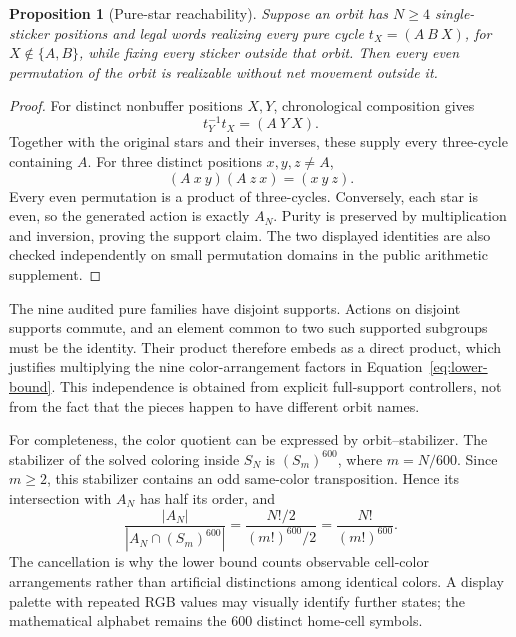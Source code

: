 \documentclass[a4paper,11pt]{article}
\newtheorem{proposition}{Proposition}[section]
\begin{document}
\begin{proposition}[Pure-star reachability]
Suppose an orbit has \(N\ge4\) single-sticker positions and legal words realizing every pure cycle \(t_X=(A\ B\ X)\), for \(X\notin\{A,B\}\), while fixing every sticker outside that orbit. Then every even permutation of the orbit is realizable without net movement outside it.
\end{proposition}
\begin{proof}
For distinct nonbuffer positions \(X,Y\), chronological composition gives
\begin{equation}
t_Y^{-1}t_X=(A\ Y\ X).
\label{eq:star-generation}
\end{equation}
Together with the original stars and their inverses, these supply every three-cycle containing \(A\). For three distinct positions \(x,y,z\ne A\),
\begin{equation}
(A\ x\ y)(A\ z\ x)=(x\ y\ z).
\label{eq:all-three-cycles}
\end{equation}
Every even permutation is a product of three-cycles. Conversely, each star is even, so the generated action is exactly \(A_N\). Purity is preserved by multiplication and inversion, proving the support claim. The two displayed identities are also checked independently on small permutation domains in the public arithmetic supplement.
\end{proof}

The nine audited pure families have disjoint supports. Actions on disjoint supports commute, and an element common to two such supported subgroups must be the identity. Their product therefore embeds as a direct product, which justifies multiplying the nine color-arrangement factors in Equation~\eqref{eq:lower-bound}. This independence is obtained from explicit full-support controllers, not from the fact that the pieces happen to have different orbit names.

For completeness, the color quotient can be expressed by orbit--stabilizer. The stabilizer of the solved coloring inside \(S_N\) is \((S_m)^{600}\), where \(m=N/600\). Since \(m\ge2\), this stabilizer contains an odd same-color transposition. Hence its intersection with \(A_N\) has half its order, and
\begin{equation}
\frac{|A_N|}{|A_N\cap(S_m)^{600}|}
=\frac{N!/2}{(m!)^{600}/2}
=\frac{N!}{(m!)^{600}}.
\label{eq:color-orbit-stabilizer}
\end{equation}
The cancellation is why the lower bound counts observable cell-color arrangements rather than artificial distinctions among identical colors. A display palette with repeated RGB values may visually identify further states; the mathematical alphabet remains the 600 distinct home-cell symbols.
\end{document}
